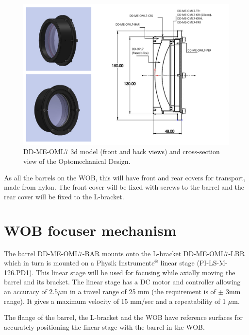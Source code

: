 \documentclass{report}
\begin{document}
\begin{figure}
\begin{center}
\includegraphics[width=1.1\linewidth]{figures/DD-ME-OML7.png}
\end{center}
\caption{DD-ME-OML7 3d model (front and back views) and cross-section view of the Optomechanical Design.}
\label{figure:WOB-OML7}
\end{figure}

As all the barrels on the WOB, this will have front and rear covers for transport, made from nylon. The front cover will be fixed with screws to the barrel and the rear cover will be fixed to the L-bracket.

\section{WOB focuser mechanism}

The barrel DD-ME-OML7-BAR mounts onto the L-bracket DD-ME-OML7-LBR which in turn is mounted on a Physik Instrumente${}^\circledR$ linear stage (PI-LS-M-126.PD1). This linear stage will be used for focusing while axially moving the barrel and its bracket. The linear stage has a DC motor and controller allowing an accuracy of 2.5$\mu$m in a travel range of 25 mm (the requirement is of $\pm$ 3mm range). It gives a maximum velocity of 15 mm/sec and a repeatability of 1 $\mu$m. 

The flange of the barrel, the L-bracket and the WOB have reference surfaces for accurately positioning the linear stage with the barrel in the WOB. 
\end{document}
